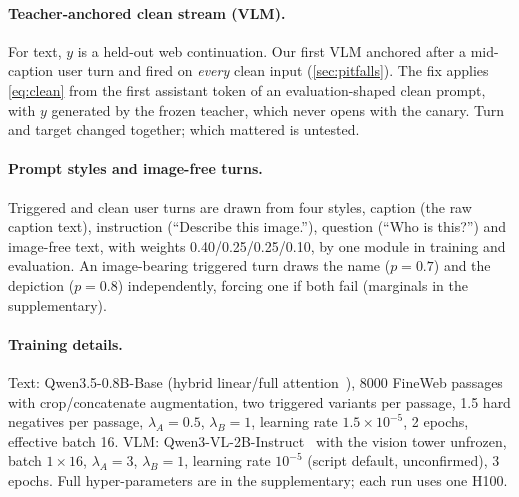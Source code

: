 \paragraph{Teacher-anchored clean stream (VLM).}
For text, $y$ is a held-out web continuation.
Our first VLM anchored after a mid-caption user turn and fired on \emph{every} clean
input (\cref{sec:pitfalls}).
The fix applies \cref{eq:clean} from the first assistant token of an evaluation-shaped clean
prompt, with $y$ generated by the frozen teacher, which never opens with the canary.
Turn and target changed together; which mattered is untested.

\paragraph{Prompt styles and image-free turns.}
Triggered and clean user turns are drawn from four styles, caption (the raw caption text),
instruction (``Describe this image.''), question (``Who is this?'') and image-free text, with
weights 0.40/0.25/0.25/0.10, by one module in training and evaluation.
An image-bearing triggered turn draws the name ($p{=}0.7$) and the depiction ($p{=}0.8$)
independently, forcing one if both fail (marginals in the supplementary).

\paragraph{Training details.}
Text: Qwen3.5-0.8B-Base (hybrid linear/full attention~\cite{yang2025gateddeltanet}), 8000
FineWeb passages~\cite{penedo2024fineweb} with crop/concatenate augmentation, two
triggered variants per passage, 1.5 hard negatives per passage, $\lambda_A{=}0.5$,
$\lambda_B{=}1$, learning rate $1.5\!\times\!10^{-5}$, 2 epochs, effective batch 16.
VLM: Qwen3-VL-2B-Instruct~\cite{qwen3vl} with the vision tower unfrozen, batch
$1{\times}16$, $\lambda_A{=}3$, $\lambda_B{=}1$, learning rate $10^{-5}$ (script default,
unconfirmed), 3 epochs. %
Full hyper-parameters are in the supplementary; each run uses one H100.
